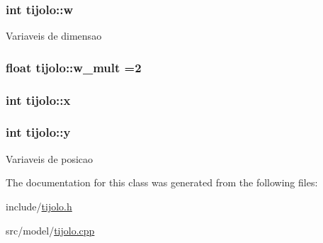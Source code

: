 \subsubsection[{\texorpdfstring{w}{w}}]{\setlength{\rightskip}{0pt plus 5cm}int tijolo\+::w\hspace{0.3cm}{\ttfamily [private]}}\hypertarget{classtijolo_a11e0c9ba0ab09baad2622ba49de44f8a}{}\label{classtijolo_a11e0c9ba0ab09baad2622ba49de44f8a}
Variaveis de dimensao 
\subsubsection[{\texorpdfstring{w\+\_\+mult}{w_mult}}]{\setlength{\rightskip}{0pt plus 5cm}float tijolo\+::w\+\_\+mult =2\hspace{0.3cm}{\ttfamily [private]}}\hypertarget{classtijolo_a541d86c88882bb3be2199b10f840777c}{}\label{classtijolo_a541d86c88882bb3be2199b10f840777c}
\subsubsection[{\texorpdfstring{x}{x}}]{\setlength{\rightskip}{0pt plus 5cm}int tijolo\+::x\hspace{0.3cm}{\ttfamily [private]}}\hypertarget{classtijolo_acd39a70440853d5f019378ab501fb688}{}\label{classtijolo_acd39a70440853d5f019378ab501fb688}
\subsubsection[{\texorpdfstring{y}{y}}]{\setlength{\rightskip}{0pt plus 5cm}int tijolo\+::y\hspace{0.3cm}{\ttfamily [private]}}\hypertarget{classtijolo_a3089987dab8db697303f88bd59c0989f}{}\label{classtijolo_a3089987dab8db697303f88bd59c0989f}
Variaveis de posicao 

The documentation for this class was generated from the following files\+:\begin{DoxyCompactItemize}
\item 
include/\hyperlink{tijolo_8h}{tijolo.\+h}\item 
src/model/\hyperlink{tijolo_8cpp}{tijolo.\+cpp}\end{DoxyCompactItemize}
